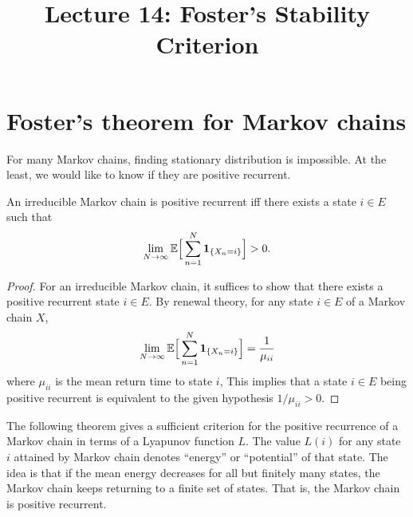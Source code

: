 \documentclass[a4paper,10pt,english]{article}
\title{Lecture 14: Foster's Stability Criterion}
\date{}%
\author{}
\begin{document}
\maketitle
\section{Foster's theorem for Markov chains}
For many Markov chains, finding stationary distribution is impossible. 
At the least, we would like to know if they are positive recurrent. 

\begin{lem} 
An irreducible Markov chain is positive recurrent iff there exists a state $i \in E$ such that
\begin{align*}
\lim_{N \to \infty} \E\Big[ \sum_{n=1}^{N} \boldsymbol{1}_{\{X_n=i \}} \Big] > 0. %
\end{align*}
\end{lem}
\begin{proof}
For an irreducible Markov chain, it suffices to show that there exists a positive recurrent state $i \in E$. 
By renewal theory, for any state $i \in E$ of a Markov chain $X$,
\begin{align*}
\lim_{N \to \infty} \mathbb{E}\Big[ \sum_{n=1}^{N} \boldsymbol{1}_{\{X_n=i\}} \Big] = \frac{1}{\mu _{ii}} 
\end{align*}
where $\mu_{ii}$ is the mean return time to state $i$, 
This implies that a state $i \in E$ being positive recurrent is equivalent to the given hypothesis $1/\mu_{ii} > 0$. 
\end{proof}

The following theorem gives a sufficient criterion for the positive recurrence of a Markov chain in terms of a Lyapunov function $L$. 
The value $L(i)$ for any state $i$ attained by Markov chain denotes ``energy'' or ``potential'' of that state. 
The idea is that if the mean energy decreases for all but finitely many states, the Markov chain keeps returning to a finite set of states. 
That is, the Markov chain is positive recurrent. 
\end{document}
